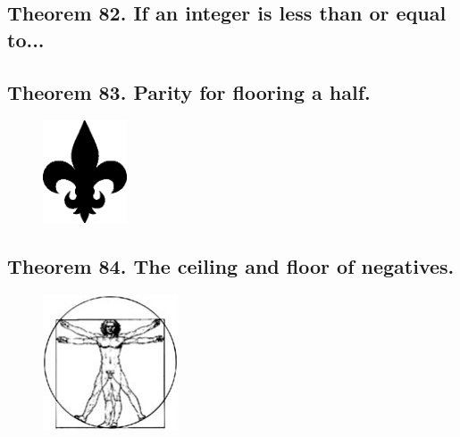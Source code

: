 \documentclass[preview]{standalone}
\begin{document}
\subsection[If an integer is less than or equal to...]
    {
        \color{section}Theorem 82. \color{black} If an integer is less than or equal to...
    }

\pagebreak


\subsection[Parity for flooring a half.]
    {
        \color{section}Theorem 83. \color{black} Parity for flooring a half.
    }

\begin{figure}[!h]
    \centering
    \includegraphics[width=2.5cm]{../resources/jpg/2.3.functions/symbol3.png}
\end{figure}
\pagebreak


\subsection[The ceiling and floor of negative numbers.]
    {
        \color{section}Theorem 84. \color{black} The ceiling and floor of negatives.
    }

\vspace{2\baselineskip}
\begin{figure}[!h]
    \centering
    \includegraphics[width=4cm]{../resources/jpg/2.3.functions/symbol4.jpg}
\end{figure}
\pagebreak
\end{document}
